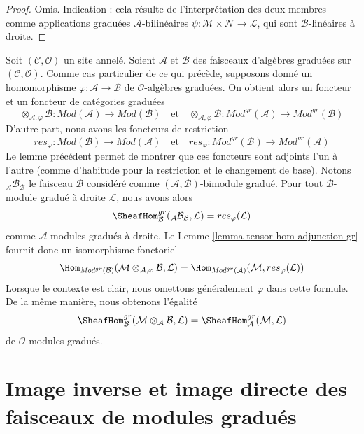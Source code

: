 \begin{proof}
Omis. Indication : cela résulte de l'interprétation des deux membres comme
applications graduées $\mathcal{A}$-bilinéaires
$\psi : \mathcal{M} \times \mathcal{N} \to \mathcal{L}$,
qui sont $\mathcal{B}$-linéaires à droite.
\end{proof}

\noindent
Soit $(\mathcal{C}, \mathcal{O})$ un site annelé. Soient $\mathcal{A}$
et $\mathcal{B}$ des faisceaux d'algèbres graduées sur
$(\mathcal{C}, \mathcal{O})$. Comme cas particulier de ce qui précède,
supposons donné un homomorphisme
$\varphi : \mathcal{A} \to \mathcal{B}$ de $\mathcal{O}$-algèbres graduées.
On obtient alors un foncteur et un foncteur de catégories graduées
$$
\otimes_{\mathcal{A}, \varphi} \mathcal{B} :
\textit{Mod}(\mathcal{A})
\longrightarrow
\textit{Mod}(\mathcal{B})
\quad\text{et}\quad
\otimes_{\mathcal{A}, \varphi} \mathcal{B} :
\textit{Mod}^{gr}(\mathcal{A})
\longrightarrow
\textit{Mod}^{gr}(\mathcal{B})
$$
D'autre part, nous avons les foncteurs de restriction
$$
res_\varphi :
\textit{Mod}(\mathcal{B})
\longrightarrow
\textit{Mod}(\mathcal{A})
\quad\text{et}\quad
res_\varphi :
\textit{Mod}^{gr}(\mathcal{B})
\longrightarrow
\textit{Mod}^{gr}(\mathcal{A})
$$
Le lemme précédent permet de montrer que ces foncteurs sont adjoints l'un à
l'autre (comme d'habitude pour la restriction et le changement de base).
Notons ${}_\mathcal{A}\mathcal{B}_\mathcal{B}$ le faisceau $\mathcal{B}$
considéré comme $(\mathcal{A}, \mathcal{B})$-bimodule gradué. Pour tout
$\mathcal{B}$-module gradué à droite $\mathcal{L}$, nous avons alors
$$
\SheafHom_\mathcal{B}^{gr}({}_\mathcal{A}\mathcal{B}_\mathcal{B}, \mathcal{L})
= res_\varphi(\mathcal{L})
$$
comme $\mathcal{A}$-modules gradués à droite. Le Lemme
\ref{lemma-tensor-hom-adjunction-gr} fournit donc un isomorphisme fonctoriel
$$
\Hom_{\textit{Mod}^{gr}(\mathcal{B})}(
\mathcal{M} \otimes_{\mathcal{A}, \varphi} \mathcal{B}, \mathcal{L}) =
\Hom_{\textit{Mod}^{gr}(\mathcal{A})}(
\mathcal{M}, res_\varphi(\mathcal{L}))
$$
Lorsque le contexte est clair, nous omettons généralement $\varphi$ dans cette
formule. De la même manière, nous obtenons l'égalité
$$
\SheafHom^{gr}_\mathcal{B}(
\mathcal{M} \otimes_\mathcal{A} \mathcal{B}, \mathcal{L}) =
\SheafHom_\mathcal{A}^{gr}(\mathcal{M}, \mathcal{L})
$$
de $\mathcal{O}$-modules gradués.




\section{Image inverse et image directe des faisceaux de modules gradués}
\label{section-functoriality-graded}

